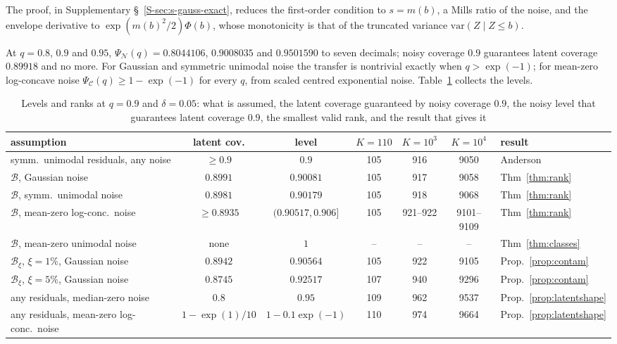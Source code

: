 \documentclass[12pt]{article}
\theoremstyle{definition}
\newcommand{\B}{\mathcal{B}}
\newcommand{\E}{\mathcal{C}}
\newcommand{\N}{\mathcal{N}}
\newcommand{\var}{\mathrm{var}}
\begin{document}
The proof, in Supplementary \S~\ref{S-sec:s-gauss-exact}, reduces the first-order condition to $s = m(b)$, a Mills ratio of the noise, and the envelope derivative to $\exp(m(b)^2/2)\Phi(b)$, whose monotonicity is that of the truncated variance $\var(Z \mid Z \le b)$.

At $q = 0.8$, $0.9$ and $0.95$, $\Psi_{\N}(q) = 0.8044106$, $0.9008035$ and $0.9501590$ to seven decimals; noisy coverage $0.9$ guarantees latent coverage $0.89918$ and no more. For Gaussian and symmetric unimodal noise the transfer is nontrivial exactly when $q > \exp(-1)$; for mean-zero log-concave noise $\Psi_{\E}(q) \ge 1 - \exp(-1)$ for every $q$, from scaled centred exponential noise. Table~\ref{tab:map} collects the levels.

\begin{table}[htbp]
\renewcommand{\baselinestretch}{1}
\caption{Levels and ranks at $q = 0.9$ and $\delta = 0.05$: what is assumed, the latent coverage guaranteed by noisy coverage $0.9$, the noisy level that guarantees latent coverage $0.9$, the smallest valid rank, and the result that gives it}
\label{tab:map}
\centering
\fontsize{8.5}{10.5pt}\selectfont\setlength{\tabcolsep}{2.5pt}
\begin{tabular}{p{3.6cm}cccccl}
\toprule
assumption & latent cov. & level & $K = 110$ & $K = 10^3$ & $K = 10^4$ & result \\
\midrule
symm.\ unimodal residuals, any noise & $\ge 0.9$ & $0.9$ & 105 & 916 & 9050 & Anderson \\
$\B$, Gaussian noise & $0.8991$ & $0.90081$ & 105 & 917 & 9058 & Thm~\ref{thm:rank} \\
$\B$, symm.\ unimodal noise & $0.8981$ & $0.90179$ & 105 & 918 & 9068 & Thm~\ref{thm:rank} \\
$\B$, mean-zero log-conc.\ noise & $\ge 0.8935$ & $(0.90517, 0.906]$ & 105 & 921--922 & 9101--9109 & Thm~\ref{thm:rank} \\
$\B$, mean-zero unimodal noise & none & $1$ & -- & -- & -- & Thm~\ref{thm:classes} \\
$\B_\xi$, $\xi = 1\%$, Gaussian noise & $0.8942$ & $0.90564$ & 105 & 922 & 9105 & Prop.~\ref{prop:contam} \\
$\B_\xi$, $\xi = 5\%$, Gaussian noise & $0.8745$ & $0.92517$ & 107 & 940 & 9296 & Prop.~\ref{prop:contam} \\
any residuals, median-zero noise & $0.8$ & $0.95$ & 109 & 962 & 9537 & Prop.~\ref{prop:latentshape} \\
any residuals, mean-zero log-conc.\ noise & $1 - \exp(1)/10$ & $1 - 0.1\exp(-1)$ & 110 & 974 & 9664 & Prop.~\ref{prop:latentshape} \\

\end{tabular}
\end{table}
\end{document}
